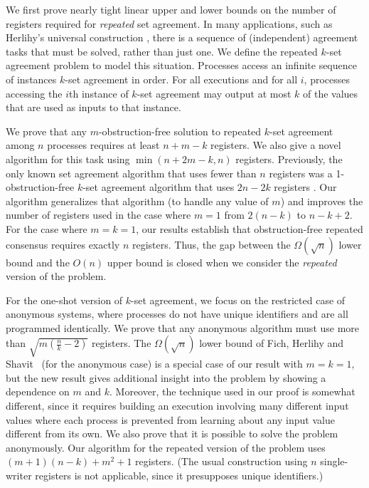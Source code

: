 \documentclass[11pt]{article}
\newcounter{ind}
\begin{document}
We first prove nearly tight linear upper and lower bounds
on the number of registers required for {\it repeated} set agreement.
In many applications, such as Herlihy's universal construction \cite{Her91},
there is a sequence of (independent) agreement tasks that 
must be solved, rather than just one.  
We define the repeated $k$-set agreement problem to model this situation.
Processes access an infinite sequence of instances $k$-set agreement in order.  
For all executions and for all $i$, processes accessing the
$i$th instance of $k$-set agreement may output at most $k$ of the values
that are used as inputs to that instance.

We prove that any $m$-obstruction-free solution to 
repeated $k$-set agreement among $n$ processes requires
at least $n+m-k$ registers.
We also give a novel algorithm for this task using
$\min(n+2m-k,n)$ registers.
Previously, the only known set agreement 
algorithm that uses fewer than $n$ registers
was a 1-obstruction-free $k$-set agreement algorithm that uses 
$2n-2k$ registers \cite{DFGR13}.
Our algorithm generalizes that algorithm (to handle any value of $m$) and
improves the number of registers used in the case where $m=1$ from 
$2(n-k)$ to $n-k+2$.
For the case where $m=k=1$, 
our results establish that obstruction-free
repeated consensus requires exactly $n$ registers.
Thus, the gap between the $\Omega(\sqrt{n})$ lower bound and the $O(n)$ upper
bound is closed when we consider the {\it repeated} version of the problem.

For the one-shot version of $k$-set agreement, we focus on the restricted case of anonymous
systems, where processes
do not have unique identifiers and are all programmed identically.
We prove
that any anonymous algorithm must use more than 
$\sqrt{m(\frac{n}{k}-2)}$ registers.
The $\Omega(\sqrt{n})$ lower bound of Fich, Herlihy and Shavit~\cite{FHS98} (for the anonymous case) is a special case of our result with $m=k=1$, but
the new result gives additional insight into the problem by showing
a dependence on $m$ and $k$.  Moreover, the technique used in our proof
is somewhat different, since it requires building an execution
involving many different input values where each process is prevented
from learning about any input value different from its own.
We also prove that it is possible to solve the problem anonymously.
Our algorithm for the repeated version of the problem uses
$(m+1)(n-k)+m^2+1$ registers.
(The usual construction using $n$ single-writer registers
is not applicable, since it presupposes
unique identifiers.)
\end{document}
